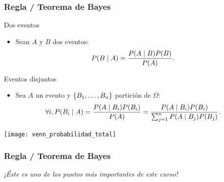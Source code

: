 \documentclass[table]{beamer}
\begin{document}
\begin{frame}
    \frametitle{Regla / Teorema de Bayes}
    \begin{block}{Dos eventos}
        \begin{itemize}
            \item Sean $A$ y $B$ dos eventos:
                \begin{equation*}
                    \prob{B \mid A} = \frac{\prob{A \mid B} \prob{B}}{\prob{A}} .
                \end{equation*}
        \end{itemize}
    \end{block}
    \begin{block}{Eventos disjuntos}
        \begin{itemize}
            \item Sea $A$ un evento y $\bparens{B_{1}, \ldots, B_{n}}$ partición de $\Omega$:
                \begin{equation*}
                    \forall i, \prob{B_{i} \mid A} = \frac{\prob{A \mid B_{i}} \prob{B_{i}}}{\prob{A}}
                    =
                    \frac{\prob{A \mid B_{i}} \prob{B_{i}}}{\sum_{j = 1}^{n} \prob{A \mid B_{j}} \prob{B_{j}}} .
                \end{equation*}
        \end{itemize}
    \end{block}
    \begin{center}
        \texttt{[image: venn\_probabilidad\_total]}
    \end{center}
\end{frame}


\iffalse
\begin{frame}
    \frametitle{Regla / Teorema de Bayes}
    \begin{center}
        \begin{Huge}
            \emph{¡Éste es uno de los puntos más importantes de este curso!}
        \end{Huge}
    \end{center}
\end{frame}
\end{document}
